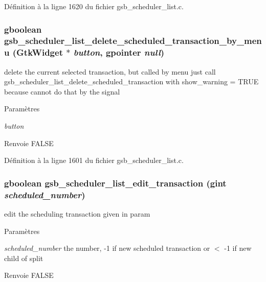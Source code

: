 Définition à la ligne 1620 du fichier gsb\_\-scheduler\_\-list.c.

\subsubsection[{gsb\_\-scheduler\_\-list\_\-delete\_\-scheduled\_\-transaction\_\-by\_\-menu}]{\setlength{\rightskip}{0pt plus 5cm}gboolean gsb\_\-scheduler\_\-list\_\-delete\_\-scheduled\_\-transaction\_\-by\_\-menu (GtkWidget $\ast$ {\em button}, \/  gpointer {\em null})}\label{gsb__scheduler__list_8c_ad3d815d7983018de7999d778590f17dc}
delete the current selected transaction, but called by menu just call gsb\_\-scheduler\_\-list\_\-delete\_\-scheduled\_\-transaction with show\_\-warning = TRUE because cannot do that by the signal


\begin{DoxyParams}{Paramètres}
\item[{\em button}]\end{DoxyParams}
\begin{DoxyReturn}{Renvoie}
FALSE 
\end{DoxyReturn}


Définition à la ligne 1601 du fichier gsb\_\-scheduler\_\-list.c.

\subsubsection[{gsb\_\-scheduler\_\-list\_\-edit\_\-transaction}]{\setlength{\rightskip}{0pt plus 5cm}gboolean gsb\_\-scheduler\_\-list\_\-edit\_\-transaction (gint {\em scheduled\_\-number})}\label{gsb__scheduler__list_8c_a10a206d10ab971adb3ea36ec263c34d2}
edit the scheduling transaction given in param


\begin{DoxyParams}{Paramètres}
\item[{\em scheduled\_\-number}]the number, -\/1 if new scheduled transaction or $<$ -\/1 if new child of split\end{DoxyParams}
\begin{DoxyReturn}{Renvoie}
FALSE 
\end{DoxyReturn}


